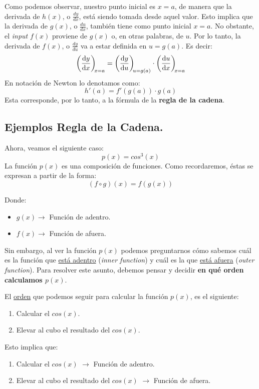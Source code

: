 \documentclass[12pt]{article}
\begin{document}
Como podemos observar, nuestro punto inicial es $x = a$, de manera que la derivada de $h(x)$, o $\frac{dy}{dx}$, está siendo tomada desde aquel valor. Esto implica que la derivada de $g(x)$, o $\frac{du}{dx}$, también tiene como punto inicial $x = a$. No obstante, el \textit{input} $f(x)$ proviene de $g(x)$ o, en otras palabras, de $u$. Por lo tanto, la derivada de $f(x)$, o $\frac{dy}{du}$ va a estar definida en $u = g(a)$. Es decir:
\[\diff{y}x[x = a] = \diff{y}u[u = g(a)] \cdot \diff{u}x[x = a]\]
En notación de Newton lo denotamos como:
\[h'(a) = f'(g(a)) \cdot g(a)\]
Esta corresponde, por lo tanto, a la fórmula de la \textbf{regla de la cadena}.




\subsection{Ejemplos Regla de la Cadena.}

Ahora, veamos el siguiente caso:
\[p(x) = cos^{3}(x)\]
La función $p(x)$ es una composición de funciones. Como recordaremos, éstas se expresan a partir de la forma:
\[(f \circ g)(x) = f(g(x))\]

\newpage

Donde:

\begin{itemize}
\item $g(x) \rightarrow$ Función de adentro.
\item $f(x) \rightarrow$ Función de afuera.
\end{itemize}

Sin embargo, al ver la función $p(x)$ podemos preguntarnos cómo sabemos cuál es la función que \underline{está adentro} (\textit{inner function}) y cuál es la que \underline{está afuera} (\textit{outer function}). Para resolver este asunto, debemos pensar y decidir \textbf{en qué orden calculamos $p(x)$}.

El \underline{orden} que podemos seguir para calcular la función $p(x)$, es el siguiente:

\begin{enumerate}
\item Calcular el $cos(x)$.
\item Elevar al cubo el resultado del $cos(x)$.
\end{enumerate}

Esto implica que:

\begin{enumerate}
\item Calcular el $cos(x)$ $\rightarrow$ Función de adentro.
\item Elevar al cubo el resultado del $cos(x)$ $\rightarrow$ Función de afuera.
\end{enumerate}
\end{document}
